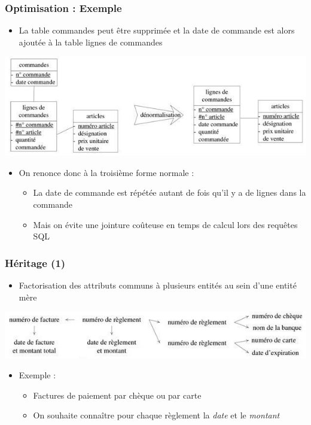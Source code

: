 \begin{frame}
  \frametitle{Optimisation : Exemple}
  \begin{itemize}
    \item La table commandes peut être supprimée et la date de commande est alors ajoutée à la table lignes de
      commandes
  \end{itemize}
  \begin{center}
    \includegraphics[width=0.9\linewidth]{optimisation.jpg}
  \end{center}
  \begin{itemize}
    \item On renonce donc à la troisième forme normale :
      \begin{itemize}
        \item La date de commande est répétée autant de fois qu'il y a de lignes dans la commande
        \item Mais on évite une jointure coûteuse en temps de calcul lors des requêtes SQL
      \end{itemize}
  \end{itemize}
\end{frame}

\begin{frame}
  \frametitle{Héritage (1)}
  \begin{itemize}
    \item Factorisation des attributs communs à plusieurs entités au sein d'une entité mère
  \end{itemize}
  \begin{center}
    \includegraphics[width=0.9\linewidth]{heritage_1.jpg}
  \end{center}
  \begin{itemize}
    \item Exemple :
      \begin{itemize}
        \item Factures de paiement par chèque ou par carte
        \item On souhaite connaître pour chaque règlement la \emph{date} et le \emph{montant}
      \end{itemize}
  \end{itemize}
\end{frame}

